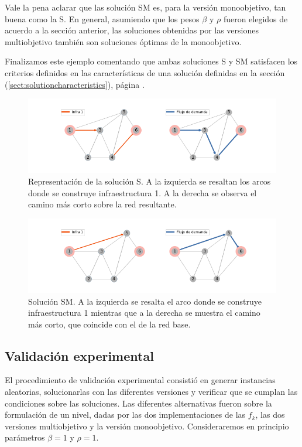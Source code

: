 \documentclass{article}
\begin{document}
  Vale la pena aclarar que las solución SM es, para la versión monoobjetivo, tan buena como la S. En general, asumiendo que los pesos $\beta$ y $\rho$ fueron elegidos de acuerdo a la sección anterior, las soluciones obtenidas por las versiones multiobjetivo también son soluciones óptimas de la monoobjetivo.

  Finalizamos este ejemplo comentando que ambas soluciones S y SM satisfacen los criterios definidos en las características de una solución definidas en la sección (\ref{sect:solutioncharacteristics}), página \pageref{sect:solutioncharacteristics}.

  \begin{figure}[h!]
    \centering
    \includegraphics[width=12cm]{../resources/example_2_sol_v2.png}
      \caption{Representación de la solución S. A la izquierda se resaltan los arcos donde se construye infraestructura 1. A la derecha se observa el camino más corto sobre la red resultante.}
    \label{fig:example2solv2}
  \end{figure}

  \begin{figure}[h!]
    \centering
    \includegraphics[width=12cm]{../resources/example_2_sol_v1.png}
      \caption{Solución SM. A la izquierda se resalta el arco donde se construye infraestructura 1 mientras que a la derecha se muestra el camino más corto, que coincide con el de la red base.}
    \label{fig:example2solv1}
  \end{figure}

  \FloatBarrier
  \subsection{Validación experimental}

  El procedimiento de validación experimental consistió en generar instancias aleatorias, solucionarlas con las diferentes versiones y verificar que se cumplan las condiciones sobre las soluciones. Las diferentes alternativas fueron sobre la formulación de un nivel, dadas por las dos implementaciones de las $f_k$, las dos versiones multiobjetivo y la versión monoobjetivo. Consideraremos en principio parámetros $\beta = 1$ y $\rho = 1$.
\end{document}
